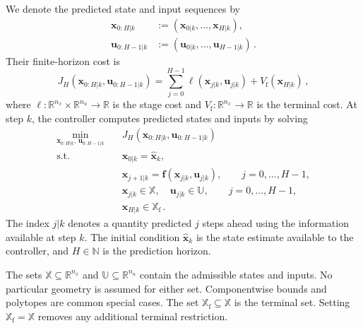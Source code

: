 We denote the predicted state and input sequences by
%
\begin{align*}
    \mathbf{x}_{0:H|k} &:= (\mathbf{x}_{0|k}, \dots, \mathbf{x}_{H|k}), \\
    \mathbf{u}_{0:H-1|k} &:= (\mathbf{u}_{0|k}, \dots, \mathbf{u}_{H-1|k}) \,.
\end{align*}
%
Their finite-horizon cost is
%
\begin{equation*}
    J_H\!\left(\mathbf{x}_{0:H|k}, \mathbf{u}_{0:H-1|k}\right)
    = \sum_{j=0}^{H-1} \ell\!\left(\mathbf{x}_{j|k}, \mathbf{u}_{j|k}\right)
    + V_\mathrm{f}\!\left(\mathbf{x}_{H|k}\right) \,,
\end{equation*}
%
where $\ell: \mathbb{R}^{n_x} \times \mathbb{R}^{n_u} \to \mathbb{R}$ is the stage cost
and $V_\mathrm{f}: \mathbb{R}^{n_x} \to \mathbb{R}$ is the terminal cost. At step $k$,
the controller computes predicted states and inputs by solving
%
\begin{equation}
    \begin{aligned}
        \min_{\mathbf{x}_{0:H|k},\,\mathbf{u}_{0:H-1|k}} \quad
        & J_H\!\left(\mathbf{x}_{0:H|k}, \mathbf{u}_{0:H-1|k}\right) \\
        \text{s.t.} \quad
        & \mathbf{x}_{0|k} = \hat{\mathbf{x}}_k, \\
        & \mathbf{x}_{j+1|k}
          = \mathbf{f}\!\left(\mathbf{x}_{j|k}, \mathbf{u}_{j|k}\right),
          \qquad j = 0, \dots, H-1, \\
        & \mathbf{x}_{j|k} \in \mathbb{X}, \quad
          \mathbf{u}_{j|k} \in \mathbb{U},
          \qquad j = 0, \dots, H-1, \\
        & \mathbf{x}_{H|k} \in \mathbb{X}_\mathrm{f} \,.
    \end{aligned}
    \label{eq:ocp}
\end{equation}
%
The index $j|k$ denotes a quantity predicted $j$ steps ahead using the information available
at step $k$. The initial condition $\hat{\mathbf{x}}_k$ is the state estimate available to
the controller, and $H \in \mathbb{N}$ is the prediction horizon. %

The sets $\mathbb{X} \subseteq \mathbb{R}^{n_x}$ and $\mathbb{U} \subseteq
\mathbb{R}^{n_u}$ contain the admissible states and inputs. No particular geometry is
assumed for either set. Componentwise bounds and polytopes are common special cases. The set
$\mathbb{X}_\mathrm{f} \subseteq \mathbb{X}$ is the terminal set. Setting
$\mathbb{X}_\mathrm{f} = \mathbb{X}$ removes any additional terminal restriction.

